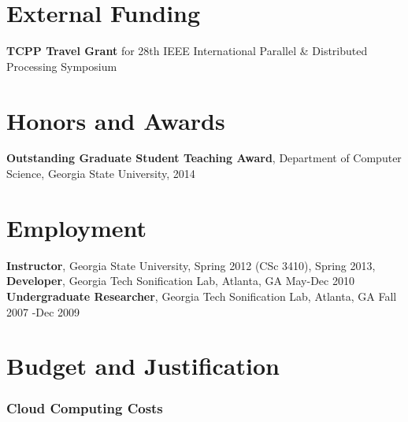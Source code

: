 \documentclass[12pt,a4paper]{article}
\begin{document}
\section*{External Funding}
\textbf{TCPP Travel Grant} for 28th IEEE International Parallel \& Distributed Processing Symposium

\section*{Honors and Awards}
\textbf{Outstanding Graduate Student Teaching Award}, Department of Computer Science, Georgia State University, 2014

\section*{Employment}
{\bf Instructor}, Georgia State University, Spring 2012 (CSc 3410), Spring 2013,\\
{\bf Developer}, Georgia Tech Sonification Lab, Atlanta, GA May-Dec 2010\\
{\bf Undergraduate Researcher}, Georgia Tech Sonification Lab, Atlanta, GA Fall 2007 -Dec 2009


\newpage 
\section{Budget and Justification}

\begin{table}[h!]


\end{table}

\subsubsection*{Cloud Computing Costs}
\end{document}
